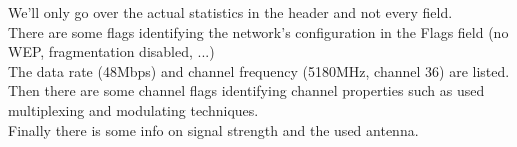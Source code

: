 We'll only go over the actual statistics in the header and not every field. \\
There are some flags identifying the network's configuration in the Flags field (no WEP, fragmentation disabled, ...)\\
The data rate (48Mbps) and channel frequency (5180MHz, channel 36) are listed. \\
Then there are some channel flags identifying channel properties such as used multiplexing and modulating techniques. \\
Finally there is some info on signal strength and the used antenna.
